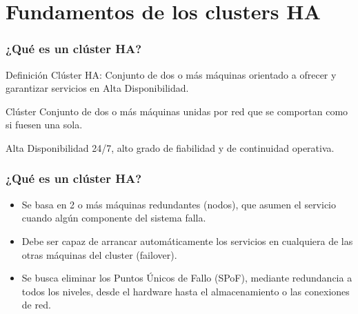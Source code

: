 \documentclass{beamer}
\begin{document}


\section{Fundamentos de los clusters HA}


\begin{frame}
\frametitle{¿Qué es un clúster HA?}

\begin{block}{Definición}
\alert{Clúster HA}: Conjunto de dos o más máquinas orientado a ofrecer y garantizar servicios en \alert{Alta Disponibilidad}. 
\end{block}

\begin{block}{Clúster}
Conjunto de dos o más máquinas unidas por red que se comportan como si fuesen una sola.
\end{block}

\begin{block}{Alta Disponibilidad}
24/7, alto grado de fiabilidad y de continuidad operativa.
\end{block}


\end{frame}


\begin{frame}
\frametitle{¿Qué es un clúster HA?}

\begin{itemize}

\item Se basa en 2 o más máquinas redundantes (\alert{nodos}), que asumen el servicio cuando algún componente del sistema falla.
\item Debe ser capaz de arrancar automáticamente los servicios en cualquiera de las otras máquinas del cluster (\alert{failover}).
\item Se busca eliminar los \alert{Puntos Únicos de Fallo} (SPoF), mediante redundancia a todos los niveles, desde el hardware hasta el almacenamiento o las conexiones de red. 
\end{itemize}

\end{frame}
\end{document}
